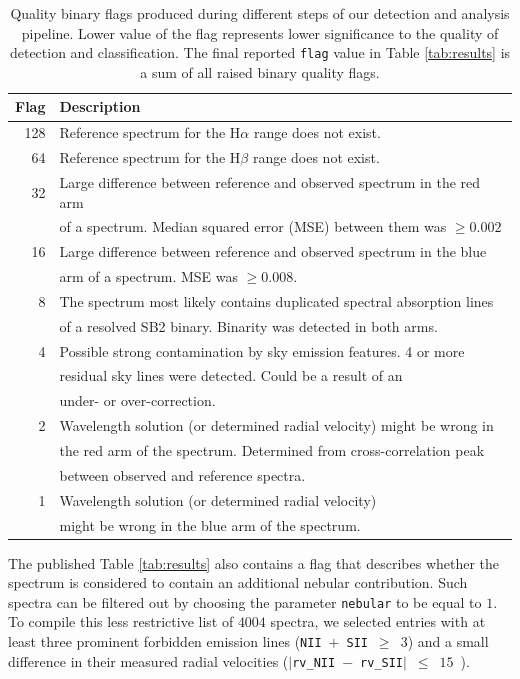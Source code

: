 \begin{table}
	\centering
	\caption{Quality binary flags produced during different steps of our detection and analysis pipeline. Lower value of the flag represents lower significance to the quality of detection and classification. The final reported \texttt{flag} value in Table \ref{tab:results} is a sum of all raised binary quality flags.}
	\label{tab:flags}
	\begin{tabular}{r l}
		\hline
		Flag & Description \\
		\hline
		128 & Reference spectrum for the H$\alpha$ range does not exist.\\
		64 & Reference spectrum for the H$\beta$ range does not exist.\\
		32 & Large difference between reference and observed spectrum in the red arm\\
		   & of a spectrum. Median squared error (MSE) between them was $\ge 0.002$\\
		16 & Large difference between reference and observed spectrum in the blue \\
		   & arm of a spectrum. MSE was $\ge 0.008$.\\
		8 & The spectrum most likely contains duplicated spectral absorption lines \\
		  & of a resolved SB2 binary. Binarity was detected in both arms.\\
		4 & Possible strong contamination by sky emission features. 4 or more \\
		  & residual sky lines were detected. Could be a result of an \\
		  & under- or over-correction.\\
		2 & Wavelength solution (or determined radial velocity) might be wrong in \\
		  & the red arm of the spectrum. Determined from cross-correlation peak \\
		  & between observed and reference spectra.\\
		1 & Wavelength solution (or determined radial velocity)\\
		  & might be wrong in the blue arm of the spectrum.\\
		\hline
	\end{tabular}
\end{table}

The published Table \ref{tab:results} also contains a flag that describes whether the spectrum is considered to contain an additional nebular contribution. Such spectra can be filtered out by choosing the parameter \texttt{nebular} to be equal to $1$. To compile this less restrictive list of $4004$ spectra, we selected entries with at least three prominent forbidden emission lines (\texttt{NII}~$+$~\texttt{SII}~$\ge$~$3$) and a small difference in their measured radial velocities ($|$\texttt{rv\_NII}~$-$~\texttt{rv\_SII}$|$~$\le$~$15$~\kms).

